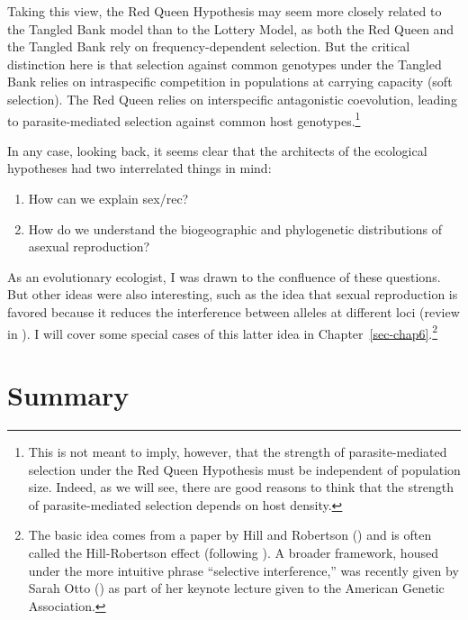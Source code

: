 \documentclass[
  letterpaper,
]{book}
\providecommand{\tightlist}{%
  \setlength{\itemsep}{0pt}\setlength{\parskip}{0pt}}\usepackage{longtable,booktabs,array}
\begin{document}
Taking this view, the Red Queen Hypothesis may seem more closely related
to the Tangled Bank model than to the Lottery Model, as both the Red
Queen and the Tangled Bank rely on frequency-dependent selection. But
the critical distinction here is that selection against common genotypes
under the Tangled Bank relies on intraspecific competition in
populations at carrying capacity (soft selection). The Red Queen relies
on interspecific antagonistic coevolution, leading to parasite-mediated
selection against common host genotypes.\footnote{This is not meant to
  imply, however, that the strength of parasite-mediated selection under
  the Red Queen Hypothesis must be independent of population size.
  Indeed, as we will see, there are good reasons to think that the
  strength of parasite-mediated selection depends on host density.}

In any case, looking back, it seems clear that the architects of the
ecological hypotheses had two interrelated things in mind:

\begin{enumerate}
\def\labelenumi{\arabic{enumi}.}
\tightlist
\item
  How can we explain sex/rec?
\item
  How do we understand the biogeographic and phylogenetic distributions
  of asexual reproduction?
\end{enumerate}

As an evolutionary ecologist, I was drawn to the confluence of these
questions. But other ideas were also interesting, such as the idea that
sexual reproduction is favored because it reduces the interference
between alleles at different loci (review in
). I will cover some special cases of
this latter idea in Chapter~\ref{sec-chap6}.\footnote{The basic idea
  comes from a paper by Hill and Robertson
  () and is often called the
  Hill-Robertson effect (following
  ). A broader
  framework, housed under the more intuitive phrase ``selective
  interference,'' was recently given by Sarah Otto
  () as part of her keynote lecture given
  to the American Genetic Association.}

\section{Summary}\label{summary-1}
\end{document}
